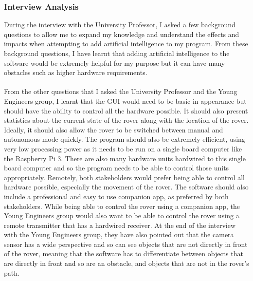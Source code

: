 \documentclass[11pt]{report}
\begin{document}
		\subsubsection{Interview Analysis}

			During the interview with the University Professor, I asked a few background questions to allow me to expand my knowledge and understand the effects and impacts when attempting to add artificial intelligence to my program. From these background questions, I have learnt that adding artificial intelligence to the software would be extremely helpful for my purpose but it can have many obstacles such as higher hardware requirements.\\
			\\
			From the other questions that I asked the University Professor and the Young Engineers group, I learnt that the GUI would need to be basic in appearance but should have the ability to control all the hardware possible. It should also present statistics about the current state of the rover along with the location of the rover. Ideally, it should also allow the rover to be switched between manual and autonomous mode quickly. The program should also be extremely efficient, using very low processing power as it needs to be run on a single board computer like the Raspberry Pi 3. There are also many hardware units hardwired to this single board computer and so the program needs to be able to control those units appropriately. Remotely, both stakeholders would prefer being able to control all hardware possible, especially the movement of the rover. The software should also include a professional and easy to use companion app, as preferred by both stakeholders. While being able to control the rover using a companion app, the Young Engineers group would also want to be able to control the rover using a remote transmitter that has a hardwired receiver. At the end of the interview with the Young Engineers group, they have also pointed out that the camera sensor has a wide perspective and so can see objects that are not directly in front of the rover, meaning that the software has to differentiate between objects that are directly in front and so are an obstacle, and objects that are not in the rover's path. 
\end{document}
